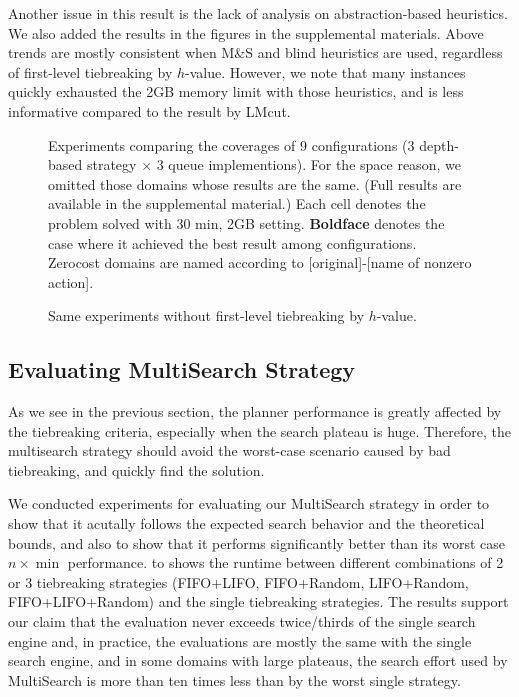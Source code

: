 Another issue in this result is the lack of analysis on
abstraction-based heuristics. We also added the results in the figures
in the supplemental materials. Above trends are mostly consistent when
M\&S and blind heuristics are used, regardless of first-level
tiebreaking by $h$-value. However, we note that many instances quickly
exhausted the 2GB memory limit with those heuristics, and is less
informative compared to the result by LMcut.

\begin{figure}[htb]
 \centering
 
 \caption{Experiments
 comparing the coverages of 9 configurations (3 depth-based strategy
 $\times$ 3 queue implementions). For the space reason, we omitted those
 domains whose results are the same. (Full results are available in the
 supplemental material.) Each cell denotes the problem solved with 30
 min, 2GB setting. \textbf{Boldface} denotes the case where it achieved
 the best result among configurations. Zerocost domains are named
 according to [original]-[name of nonzero action].}
 \label{depth}
\end{figure}

\begin{figure}[htb]
 \centering
 
 \caption{Same experiments without first-level tiebreaking by $h$-value.}
 \label{depth-noh}
\end{figure}


\subsection{Evaluating MultiSearch Strategy}

As we see in the previous section, the planner performance is greatly
affected by the tiebreaking criteria, especially when the search plateau
is huge. Therefore, the multisearch strategy should avoid the
worst-case scenario caused by bad tiebreaking, and quickly find the solution.

We conducted experiments for evaluating our MultiSearch
strategy in order to show that it acutally follows the expected search
behavior and the theoretical bounds, and also to show that it performs
significantly better than its worst case $n \times \min$ performance.
 to  shows the runtime between
different combinations of 2 or 3 tiebreaking strategies (FIFO+LIFO,
FIFO+Random, LIFO+Random, FIFO+LIFO+Random) and the single tiebreaking
strategies. The results support our claim that the evaluation never
exceeds twice/thirds of the single search engine and, in practice, the
evaluations are mostly the same with the single search engine, and in
some domains with large plateaus, the search effort used by MultiSearch
is more than ten times less than by the worst single strategy.

